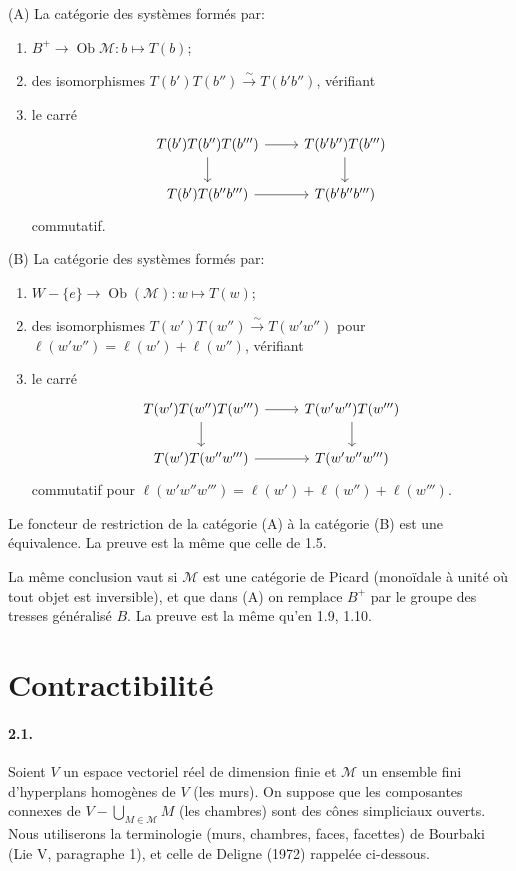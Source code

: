 \documentclass[11pt]{article}
\newcommand{\Ob}{\operatorname{Ob}}
\newcommand{\calM}{\mathcal M}
\begin{document}
(A) La catégorie des systèmes formés par:
\begin{enumerate}[label=(A.\arabic*)]
\item $B^+\to\Ob\calM:b\mapsto T(b)$;
\item des isomorphismes $T(b')T(b'')\xrightarrow{\sim}T(b'b'')$, vérifiant
\item le carré
\[
\begin{tikzcd}
T(b')T(b'')T(b''') \arrow[r] \arrow[d] & T(b'b'')T(b''') \arrow[d]\\
T(b')T(b''b''') \arrow[r] & T(b'b''b''')
\end{tikzcd}
\]
commutatif.
\end{enumerate}

(B) La catégorie des systèmes formés par:
\begin{enumerate}[label=(B.\arabic*)]
\item $W-\{e\}\to\Ob(\calM):w\mapsto T(w)$;
\item des isomorphismes $T(w')T(w'')\xrightarrow{\sim}T(w'w'')$ pour $\ell(w'w'')=\ell(w')+\ell(w'')$, vérifiant
\item le carré
\[
\begin{tikzcd}
T(w')T(w'')T(w''') \arrow[r] \arrow[d] & T(w'w'')T(w''') \arrow[d]\\
T(w')T(w''w''') \arrow[r] & T(w'w''w''')
\end{tikzcd}
\]
commutatif pour $\ell(w'w''w''')=\ell(w')+\ell(w'')+\ell(w''')$.
\end{enumerate}
Le foncteur de restriction de la catégorie (A) à la catégorie (B) est une équivalence. La preuve est la même que celle de 1.5.

La même conclusion vaut si $\calM$ est une catégorie de Picard (monoïdale à unité où tout objet est inversible), et que dans (A) on remplace $B^+$ par le groupe des tresses généralisé $B$. La preuve est la même qu'en 1.9, 1.10.

\section{Contractibilité}
\paragraph{2.1.} Soient $V$ un espace vectoriel réel de dimension finie et $\calM$ un ensemble fini d'hyperplans homogènes de $V$ (les murs). On suppose que les composantes connexes de $V-\bigcup_{M\in\calM}M$ (les chambres) sont des cônes simpliciaux ouverts. Nous utiliserons la terminologie (murs, chambres, faces, facettes) de Bourbaki (Lie V, paragraphe 1), et celle de Deligne (1972) rappelée ci-dessous.
\end{document}

